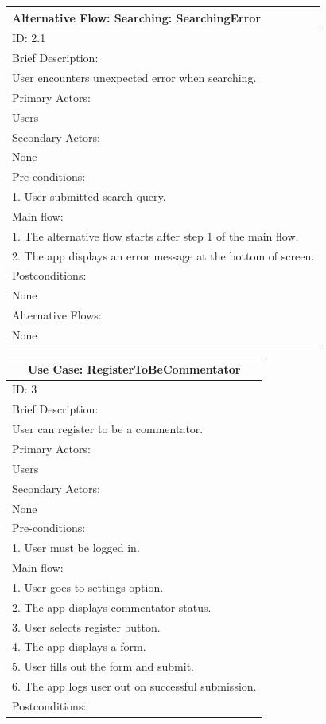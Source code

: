 \documentclass{article}
\begin{document}
\begin{flushleft}
\begin{longtable}[l]{|l|}
\hline
Alternative Flow: Searching: SearchingError\\
\hline
ID: 2.1\\
\hline
Brief Description: \\
User encounters unexpected error when searching.\\
\hline
Primary Actors:\\
Users\\
\hline
Secondary Actors:\\
None\\
\hline
Pre-conditions:\\
1. User submitted search query.\\
\hline
Main flow:\\
1. The alternative flow starts after step 1 of the main flow.\\
2. The app displays an error message at the bottom of screen.\\
\hline
Postconditions:\\
None\\
\hline
Alternative Flows:\\
None\\
\hline
\end{longtable}
\begin{longtable}[l]{|l|}
\hline
\multicolumn{1}{|c|}{Use Case: RegisterToBeCommentator}\\
\hline
ID: 3\\
\hline
Brief Description: \\
User can register to be a commentator.\\
\hline
Primary Actors:\\
Users\\
\hline
Secondary Actors:\\
None\\
\hline
Pre-conditions:\\
1. User must be logged in.\\
\hline
Main flow:\\
1. User goes to settings option.\\
2. The app displays commentator status.\\
3. User selects register button.\\
4. The app displays a form.\\
5. User fills out the form and submit.\\
6. The app logs user out on successful submission.\\
\hline
Postconditions:\\

\end{longtable}
\end{flushleft}
\end{document}

